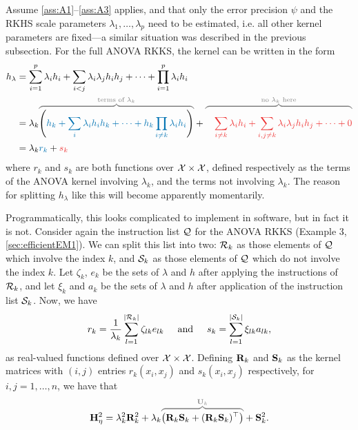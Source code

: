 Assume \ref{ass:A1}--\ref{ass:A3} applies, and that only the error precision $\psi$ and the RKHS scale parameters $\lambda_1,\dots,\lambda_p$ need to be estimated, i.e. all other kernel parameters are fixed---a similar situation was described in the previous subsection.
For the full ANOVA RKKS, the kernel can be written in the form
\begin{align*}
  h_\lambda 
  &= \sum_{i=1}^p \lambda_i h_i + \sum_{i<j} \lambda_i \lambda_j h_i h_j + \cdots + \prod_{i=1}^p \lambda_i h_i \\
  &= \lambda_k 
  \myoverbrace{
  \Bigg(  
  {\color{colblu} h_k + \sum_{i} \lambda_i h_i h_k + \cdots + h_k \prod_{i\neq k} \lambda_i h_i}
  \Bigg)
  }{\text{terms of $\lambda_k$}} 
  + 
  \myoverbrace{\color{colred}
  \phantom{\Bigg(}
  \sum_{i\neq k} \lambda_i h_i + \sum_{i,j \neq k} \lambda_i \lambda_j h_i h_j + \cdots + 0
  }{\text{no $\lambda_k$ here}} \\
  &= \lambda_k {\color{colblu}r_k} + {\color{colred}s_k}
\end{align*}
where $r_k$ and $s_k$ are both functions over ${\mathcal X}\times{\mathcal X}$, defined respectively as the terms of the ANOVA kernel involving $\lambda_k$, and the terms not involving $\lambda_k$.
The reason for splitting $h_\lambda$ like this will become apparently momentarily.

Programmatically, this looks complicated to implement in software, but in fact it is not.
Consider again the instruction list ${\mathcal Q}$ for the ANOVA RKKS (Example 3, \cref{sec:efficientEM1}).
We can split this list into two: ${\mathcal R}_k$ as those elements of ${\mathcal Q}$ which involve the index $k$, and ${\mathcal S}_k$ as those elements of ${\mathcal Q}$ which do not involve the index $k$.
Let $\zeta_k$, $e_k$ be the sets of $\lambda$ and $h$ after applying the instructions of ${\mathcal R}_k$, and let $\xi_k$ and $a_k$ be the sets of $\lambda$ and $h$ after application of the instruction list ${\mathcal S}_k$.
Now, we have 
\[
  r_k = \frac{1}{\lambda_k} \sum_{l=1}^{\lvert{\mathcal R}_k\rvert} \zeta_{lk} e_{lk} 
  \hspace{0.5cm}\text{and}\hspace{0.5cm}
  s_k = \sum_{l=1}^{\lvert{\mathcal S}_k\rvert} \xi_{lk} a_{lk},   
\]
as real-valued functions defined over ${\mathcal X}\times{\mathcal X}$.
Defining ${\mathbf R}_k$ and ${\mathbf S}_k$ as the kernel matrices with $(i,j)$ entries $r_k(x_i,x_j)$ and $s_k(x_i,x_j)$ respectively, for $i,j=1,\dots,n$, we have that
\[
  \bH_\eta^2 = \lambda_k^2\bR_k^2 + \lambda_k \myoverbrace{\big(\bR_k\bS_k + (\bR_k\bS_k)^\top \big)}{\bU_k} + \bS_k^2.
\]

